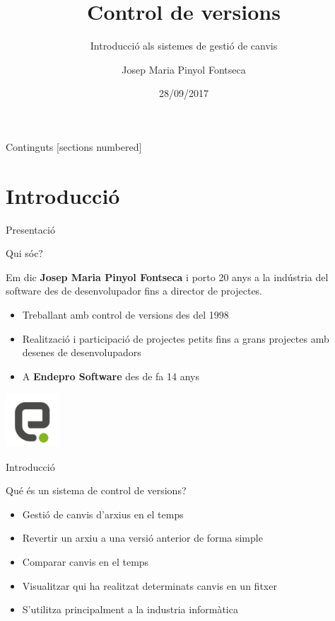 \documentclass[10pt,xcolor={rgb}]{beamer}
\title{Control de versions}
\subtitle{Introducció als sistemes de gestió de canvis}
\date{28/09/2017}
\author{Josep Maria Pinyol Fontseca}
\institute{Endepro Software, S.L.}
\begin{document}
    \maketitle
    
    \begin{frame}{Continguts}
      [sections numbered]
      \tableofcontents[hideallsubsections]
    \end{frame}
    
    
    \section{Introducció}    
    
    \begin{frame}[fragile]{Presentació}

      \begin{block}{Qui sóc?}

        Em dic \textbf{Josep Maria Pinyol Fontseca} i porto 20 anys a la indústria del software des de desenvolupador fins a director de projectes.

        \begin{itemize}
          \item Treballant amb control de versions des del 1998
          \item Realització i participació de projectes petits fins a grans projectes amb desenes de desenvolupadors
          \item A \textbf{Endepro Software} des de fa 14 anys
        \end{itemize}

        \centering
        \includegraphics[width=2cm, height=2cm]{endepro.png}
      \end{block}

    \end{frame}


    \begin{frame}[fragile]{Introducció}

      \begin{block}{Qué és un sistema de control de versions?}
        \begin{itemize}
          \item Gestió de canvis d'arxius en el temps
          \item Revertir un arxiu a una versió anterior de forma simple
          \item Comparar canvis en el temps
          \item Visualitzar qui ha realitzat determinats canvis en un fitxer
          \item S'utilitza principalment a la industria informàtica
        \end{itemize}
      \end{block}
      
    \end{frame}
\end{document}
